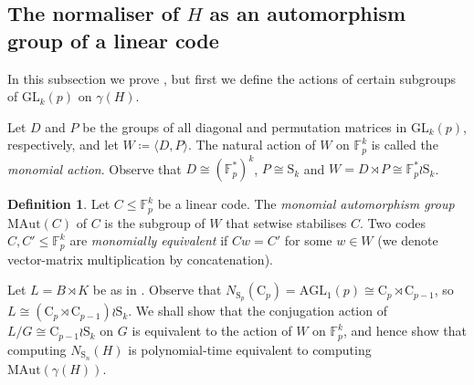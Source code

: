 \documentclass[11pt,a4paper]{article}
\theoremstyle{definition}
\newtheorem{definition}[theorem]{Definition}
\theoremstyle{remark}
\newcommand{\MAut}{\mathrm{MAut}}
\newcommand{\Sy}{\mathrm{S}}
\newcommand{\Cy}{\mathrm{C}}
\begin{document}

\subsection{The normaliser of \texorpdfstring{$H$}{H} as an automorphism group of a linear code}
\label{subsection: norm as aut}


In this subsection we prove , but first we define the actions of certain subgroups of $\mathrm{GL}_k(p)$ on $\gamma(H)$.  

Let $D$ and $P$ be the groups of all diagonal and  permutation matrices in $\mathrm{GL}_k(p)$, respectively, and let $W  \coloneqq  \langle D, P \rangle$.
The natural action of $W$ on $\mathds{F}_p^k$ is called the \emph{monomial action}.
Observe that $D \cong (\mathds{F}_{p}^*)^k$, $P \cong \Sy_k$ and $W  = D \rtimes P \cong {\mathds{F}_{p}^*} \wr \Sy_k$. 

\begin{definition} \label{defn: monomial aut}
Let $C\leq \mathds{F}_p^k$ be a linear code. 
The \emph{monomial automorphism group} $\MAut(C)$ of $C$ is the subgroup of $W$ that setwise stabilises $C$.
Two codes $C,C'\leq \mathds{F}_p^k$ are \emph{monomially equivalent} if $C w=C'$ for some $w \in W$  (we denote vector-matrix multiplication by concatenation). 
\end{definition}

Let $L = B \rtimes K$ be as in . 
Observe that $N_{\Sy_p}(\Cy_p) = \mathrm{AGL}_1(p) \cong \Cy_p \rtimes \Cy_{p-1}$, so $L \cong (\Cy_p \rtimes \Cy_{p-1}) \wr \Sy_k$. We shall show that the conjugation action of $L/G \cong \Cy_{p-1} \wr \Sy_k$ on $G$ is equivalent to the action of $W$ on $\mathds{F}_p^k$, and hence show that computing $N_{\Sy_n}(H)$ is polynomial-time equivalent to computing $\MAut(\gamma(H))$. 
\end{document}
